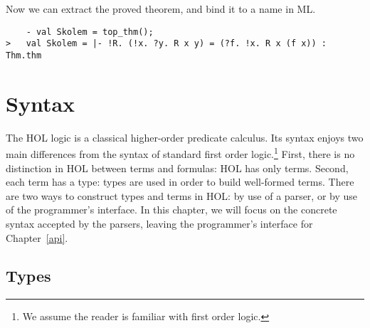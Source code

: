\documentclass[12pt,fleqn,a4paper]{report}
\begin{document}
Now we can extract the proved theorem, and
bind it to a name in ML.
\begin{verbatim}
    - val Skolem = top_thm();
>   val Skolem = |- !R. (!x. ?y. R x y) = (?f. !x. R x (f x)) : Thm.thm
\end{verbatim}


\chapter{Syntax}

The HOL logic is a classical higher-order predicate calculus. Its
syntax enjoys two main differences from the syntax of standard first
order logic.\footnote{We assume the reader is familiar with first
  order logic.}  First, there is no distinction in HOL between terms
and formulas: HOL has only terms. Second, each term has a type: types
are used in order to build well-formed terms. There are two ways to
construct types and terms in HOL: by use of a parser, or by use of the
programmer's interface. In this chapter, we will focus on the concrete
syntax accepted by the parsers, leaving the programmer's interface for
Chapter~\ref{api}.


\section{Types}
\end{document}
